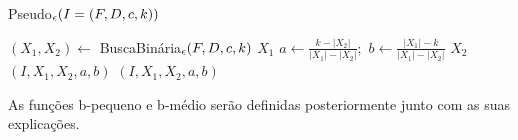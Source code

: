 \begin{algorithm}[H]
    \caption{\sc Pseudo$_\epsilon(I = (F,D,c,k))$}
    \begin{algorithmic}[1]
        \State $(X_1,X_2) \gets$ {\sc BuscaBinária$_\epsilon(F,D,c,k)$}
        \State \Return $X_1$
        \EndIf
        \State $a \gets \frac{k - |X_2|}{|X_1| - |X_2|};$ \quad $b \gets \frac{|X_1| - k}{|X_1| - |X_2|}$
            \State \Return $X_2$
            \State {}$(I,X_1,X_2,a,b)$
        \Else
            \State {}$(I,X_1,X_2,a,b)$
        \EndIf
    \end{algorithmic}
\end{algorithm}
As funções {\sc b-pequeno} e {\sc b-médio} serão definidas posteriormente junto com as suas explicações.

